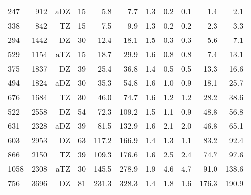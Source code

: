 \begin{table}[H]
\begin{tabular}{lrrrrrrrrrr}
 247 &  912  & aDZ  &  15 &                  5.8 &                7.7 &  1.3   &               0.2 &               0.1 &                1.4 &                2.1\\
 338 &  842  &  TZ  &  15 &                  7.5 &                9.9 &  1.3   &               0.2 &               0.2 &                2.3 &                3.3\\
 294 & 1442  &  DZ  &  30 &                 12.4 &               18.1 &  1.5   &               0.3 &               0.3 &                5.6 &                7.1\\
 529 & 1154  & aTZ  &  15 &                 18.7 &               29.9 &  1.6   &               0.8 &               0.8 &                7.4 &               13.1\\
 375 & 1837  &  DZ  &  39 &                 25.4 &               36.8 &  1.4   &               0.5 &               0.5 &               13.3 &               16.6\\
 494 & 1824  & aDZ  &  30 &                 35.3 &               54.8 &  1.6   &               1.0 &               0.9 &               18.1 &               25.7\\
 676 & 1684  &  TZ  &  30 &                 46.0 &               74.7 &  1.6   &               1.2 &               1.2 &               28.2 &               38.6\\
 522 & 2558  &  DZ  &  54 &                 72.3 &              109.2 &  1.5   &               1.1 &               0.9 &               48.8 &               56.8\\
 631 & 2328  & aDZ  &  39 &                 81.5 &              132.9 &  1.6   &               2.1 &               2.0 &               46.8 &               65.1\\
 603 & 2953  &  DZ  &  63 &                117.2 &              166.9 &  1.4   &               1.3 &               1.1 &               83.2 &               92.4\\
 866 & 2150  &  TZ  &  39 &                109.3 &              176.6 &  1.6   &               2.5 &               2.4 &               74.7 &               97.6\\
1058 & 2308  & aTZ  &  30 &                145.5 &              278.9 &  1.9   &               4.6 &               4.7 &               91.0 &              138.6\\
 756 & 3696  &  DZ  &  81 &                231.3 &              328.3 &  1.4   &               1.8 &               1.6 &              176.3 &              190.9\\

\end{tabular}
\end{table}
